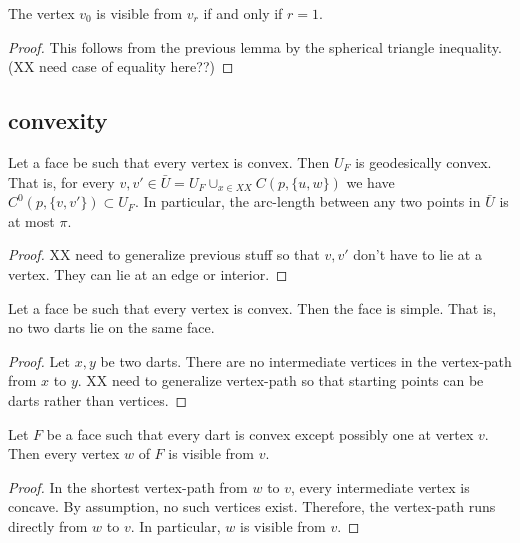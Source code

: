 \begin{lemma}  The vertex $v_0$ is visible from $v_r$ if and
only if $r=1$.
\end{lemma}

\begin{proof}  This follows from the previous lemma by the spherical triangle inequality.
(XX need case of equality here??)
\end{proof}

\subsection{convexity}


\begin{lemma}  Let a face be such that every vertex is convex.  Then $U_F$ is
geodesically convex.  That is, for every $v,v'\in \bar U = U_F\cup_{x\in XX} C(p,\{u,w\})$
we have $C^0(p,\{v,v'\})\subset U_F$.  In particular, the arc-length between any
two points in $\bar U$ is at most $\pi$. 
\end{lemma}

\begin{proof}
XX need to generalize previous stuff so that $v,v'$ don't have to lie at a vertex.
They can lie at an edge or interior.
\end{proof}

\begin{lemma} Let a face be such that every vertex is convex.  Then the face
is simple.  That is, no two darts lie on the same face.
\end{lemma}

\begin{proof} Let $x,y$ be two darts.
There are no intermediate vertices in the vertex-path from $x$ to $y$.
XX need to generalize vertex-path so that starting points can be darts rather than
vertices.
\end{proof}

\begin{lemma}\label{lemma:details}
Let $F$ be a face such that every dart is convex except possibly one
at vertex $v$.  Then  every vertex $w$ of $F$ is visible from $v$.
\end{lemma}

\begin{proof}  In the shortest vertex-path from $w$ to $v$, every intermediate
vertex is concave.  By assumption, no such vertices exist.  Therefore,
the vertex-path runs directly from $w$ to $v$.  In particular,
$w$ is visible from $v$.
\end{proof}

